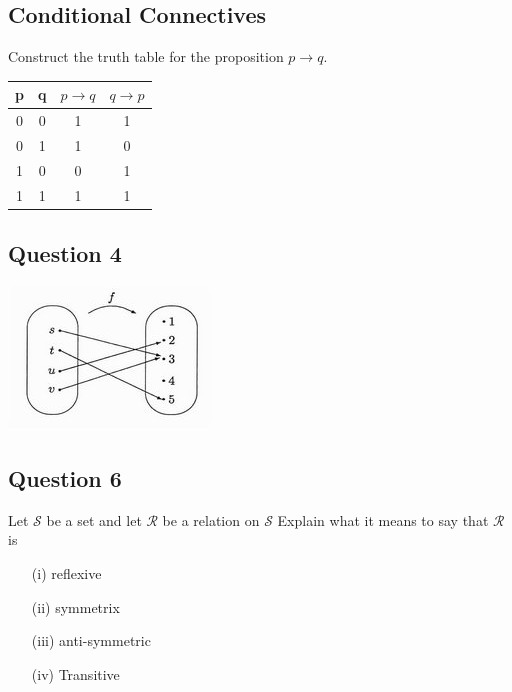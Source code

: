 \documentclass[]{report}
\begin{document}
\begin{enumerate}
\section{Conditional Connectives}
Construct the truth table for the proposition $p \rightarrow q$.

\begin{center}
\begin{tabular}{|c|c|c|c|}
\hline
p & q & $p \rightarrow q$ & $q \rightarrow p$ \\
\hline
0 & 0 & 1& 1 \\
0 & 1 & 1 & 0 \\
1 & 0 & 0 & 1 \\
1 & 1 & 1 & 1 \\
\hline
\end{tabular}
\end{center}


\subsection*{Question 4}
\begin{center}
\includegraphics[scale=0.55]{HibCollArrow.jpg}
\end{center}

\subsection*{Question 6}
Let $\mathcal{S}$ be a set and let $\mathcal{R}$ be a relation on $\mathcal{S}$
Explain what it means to say that $\mathcal{R}$ is

\begin{itemize}
\item[(i)] reflexive
\item[(ii)] symmetrix
\item[(iii)] anti-symmetric
\item[(iv)] Transitive
\end{itemize}



\end{enumerate}
\end{document}
